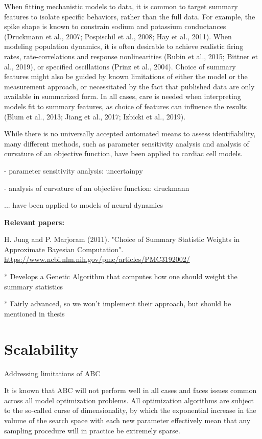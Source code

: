 When fitting mechanistic models to data, it is common to target summary features to isolate specific behaviors, rather than the full data. For example, the spike shape is known to constrain sodium and potassium conductances (Druckmann et al., 2007; Pospischil et al., 2008; Hay et al., 2011). When modeling population dynamics, it is often desirable to achieve realistic firing rates, rate-correlations and response nonlinearities (Rubin et al., 2015; Bittner et al., 2019), or specified oscillations (Prinz et al., 2004). Choice of summary features might also be guided by known limitations of either the model or the measurement approach, or necessitated by the fact that published data are only available in summarized form.  In all cases, care is needed when interpreting models fit to summary features, as choice of features can influence the results (Blum et al., 2013; Jiang et al., 2017; Izbicki et al., 2019).


While there is no universally accepted automated means to assess identifiability, many different methods, such as parameter sensitivity analysis and analysis of curvature of an objective function, have been applied to cardiac cell models.   


- parameter sensitivity analysis: uncertainpy 

- analysis of curvature of an objective function: druckmann

... have been applied to models of neural dynamics

\textbf{Relevant papers:}

H. Jung and P. Marjoram (2011). "Choice of Summary Statistic Weights in Approximate Bayesian Computation". \url{https://www.ncbi.nlm.nih.gov/pmc/articles/PMC3192002/}

* Develops a Genetic Algorithm that computes how one should weight the summary statistics 

* Fairly advanced, so we won't implement their approach, but should be mentioned in thesis

\section{Scalability}

Addressing limitations of ABC

It is known that ABC will not perform well in all cases and faces issues common across all model optimization problems. All optimization algorithms are subject to the so-called curse of dimensionality, by which the exponential increase in the volume of the search space with each new parameter effectively mean that any sampling procedure will in practice be extremely sparse. 


